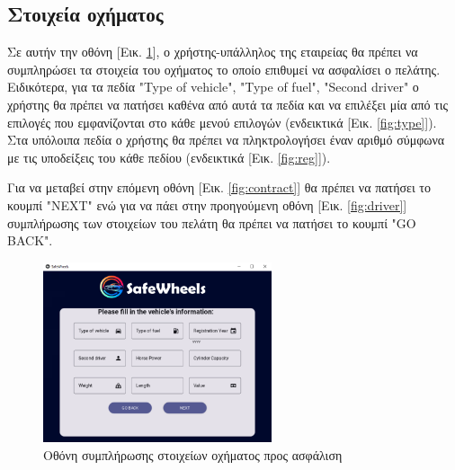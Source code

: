 \documentclass{llncs}
\begin{document}
\subsection{Στοιχεία οχήματος}
Σε αυτήν την οθόνη [Εικ. \ref{fig:vehicle}], ο χρήστης-υπάλληλος της εταιρείας θα πρέπει να συμπληρώσει τα στοιχεία του οχήματος το οποίο επιθυμεί να ασφαλίσει ο πελάτης. Ειδικότερα, για τα πεδία 
"Type of vehicle", "Type of fuel", "Second driver" ο χρήστης θα πρέπει να πατήσει καθένα από αυτά τα πεδία και να επιλέξει μία από τις επιλογές που εμφανίζονται στο κάθε μενού επιλογών (ενδεικτικά [Εικ. \ref{fig:type}]). 
Στα υπόλοιπα πεδία ο χρήστης θα πρέπει να πληκτρολογήσει έναν αριθμό σύμφωνα με τις υποδείξεις του κάθε πεδίου (ενδεικτικά [Εικ. \ref{fig:reg}]).

Για να μεταβεί στην επόμενη οθόνη [Εικ. \ref{fig:contract}] θα πρέπει να πατήσει το κουμπί "NEXT" ενώ για να πάει στην προηγούμενη οθόνη [Εικ. \ref{fig:driver}] συμπλήρωσης των στοιχείων του πελάτη θα πρέπει να πατήσει το κουμπί "GO BACK".

\begin{figure}
    \begin{center}
        \includegraphics[width=0.6\textwidth]{images/vehicle.png}
    \end{center}
    \caption{Οθόνη συμπλήρωσης στοιχείων οχήματος προς ασφάλιση}  
    \label{fig:vehicle}  
\end{figure}
\end{document}
